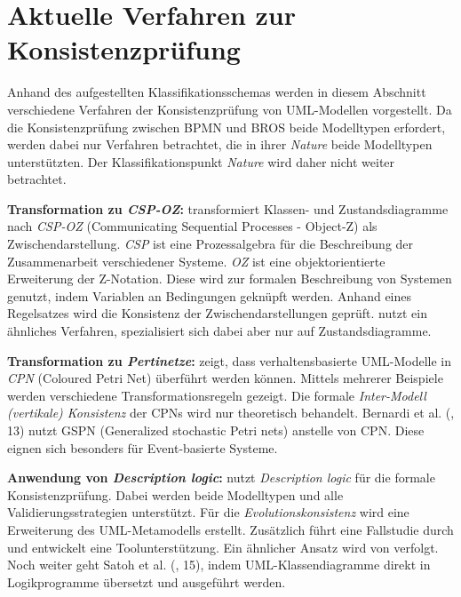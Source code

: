 \section{Aktuelle Verfahren zur Konsistenzprüfung}

Anhand des aufgestellten Klassifikationsschemas werden in diesem Abschnitt verschiedene Verfahren der Konsistenzprüfung von UML-Modellen vorgestellt.
Da die Konsistenzprüfung zwischen BPMN und BROS beide Modelltypen erfordert, werden dabei nur Verfahren betrachtet, die in ihrer \emph{Nature} beide Modelltypen unterstützten.
Der Klassifikationspunkt \emph{Nature} wird daher nicht weiter betrachtet.

\textbf{Transformation zu \emph{CSP-OZ}:}
\cite{Rasch2003} transformiert Klassen- und Zustandsdiagramme nach \emph{CSP-OZ} (Communicating Sequential Processes - Object-Z) als Zwischendarstellung.
\emph{CSP} ist eine Prozessalgebra für die Beschreibung der Zusammenarbeit verschiedener Systeme. 
\emph{OZ} ist eine objektorientierte Erweiterung der Z-Notation.
Diese wird zur formalen Beschreibung von Systemen genutzt, indem Variablen an Bedingungen geknüpft werden.
Anhand eines Regelsatzes wird die Konsistenz der Zwischendarstellungen geprüft.
\cite{Kim2004} nutzt ein ähnliches Verfahren, spezialisiert sich dabei aber nur auf Zustandsdiagramme.

\textbf{Transformation zu \emph{Pertinetze}:}
\cite{Shinkawa2006} zeigt, dass verhaltensbasierte UML-Modelle in \emph{CPN} (Coloured Petri Net) überführt werden können.
Mittels mehrerer Beispiele werden verschiedene Transformationsregeln gezeigt.
Die formale \emph{Inter-Modell (vertikale) Konsistenz} der CPNs wird nur theoretisch behandelt.
Bernardi et al. (\cite{Usman2008}, 13) nutzt GSPN (Generalized stochastic Petri nets) anstelle von CPN.
Diese eignen sich besonders für Event-basierte Systeme.

\textbf{Anwendung von \emph{Description logic}:}
\cite{Mens2005} nutzt \emph{Description logic} für die formale Konsistenzprüfung.
Dabei werden beide Modelltypen und alle Validierungsstrategien unterstützt.
Für die \emph{Evolutionskonsistenz} wird eine Erweiterung des UML-Metamodells erstellt.
Zusätzlich führt \cite{Mens2005} eine Fallstudie durch und entwickelt eine Toolunterstützung.
Ein ähnlicher Ansatz wird von \cite{Simmonds2004} verfolgt.
Noch weiter geht Satoh et al. (\cite{Usman2008}, 15), indem UML-Klassendiagramme direkt in Logikprogramme übersetzt und ausgeführt werden.

